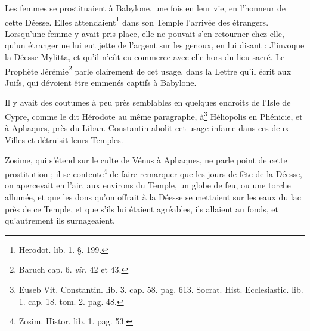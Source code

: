 \documentclass[a4paper, 11pt, oneside, polutonikogreek, french]{article}
\begin{document}
Les femmes se prostituaient à Babylone, une fois en leur vie, en l'honneur de cette Déesse. Elles attendaient\footnote{Herodot. lib. 1. §. 199.} dans son Temple l'arrivée des étrangers. Lorsqu'une femme y avait pris place, elle ne pouvait s'en retourner chez elle, qu'un étranger ne lui eut jette de l'argent sur les genoux, en lui disant : J'invoque la Déesse Mylitta, et qu'il n'eût eu commerce avec elle hors du lieu sacré. Le Prophète Jérémie\footnote{Baruch cap. 6. \emph{vir}. 42 et 43.} parle clairement de cet usage, dans la Lettre qu'il écrit aux Juifs, qui dévoient être emmenés captifs à Babylone.

Il y avait des coutumes à peu près semblables en quelques endroits de l'Isle de Cypre, comme le dit Hérodote au même paragraphe, à\footnote{Euseb Vit. Constantin. lib. 3. cap. 58. pag. 613. Socrat. Hist. Ecclesiastic. lib. 1. cap. 18. tom. 2. pag. 48.} Héliopolis en Phénicie, et à Aphaques, près du Liban. Constantin abolit cet usage infame dans ces deux Villes et détruisit leurs Temples.

Zosime, qui s'étend sur le culte de Vénus à Aphaques, ne parle point de cette prostitution ; il se contente\footnote{Zosim. Histor. lib. 1. pag. 53.} de faire remarquer que les jours de fête de la Déesse, on apercevait en l'air, aux environs du Temple, un globe de feu, ou une torche allumée, et que les dons qu'on offrait à la Déesse se mettaient sur les eaux du lac près de ce Temple, et que s'ils lui étaient agréables, ils allaient au fonds, et qu'autrement ils surnageaient.
\end{document}
